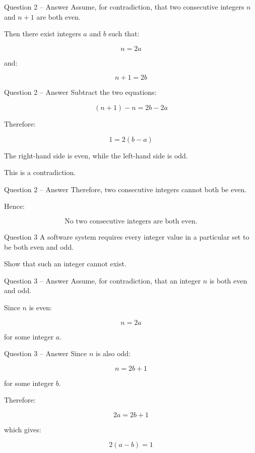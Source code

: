 \begin{frame}{Question 2 -- Answer}
Assume, for contradiction, that two consecutive integers $n$ and $n+1$
are both even.

Then there exist integers $a$ and $b$ such that:

$$
n=2a
$$

and:

$$
n+1=2b
$$

\end{frame}

\begin{frame}{Question 2 -- Answer}
Subtract the two equations:

$$
(n+1)-n=2b-2a
$$

Therefore:

$$
1=2(b-a)
$$

The right-hand side is even, while the left-hand side is odd.

This is a contradiction.
\end{frame}

\begin{frame}{Question 2 -- Answer}
Therefore, two consecutive integers cannot both be even.

Hence:

$$
\boxed{\text{No two consecutive integers are both even.}}
$$

\end{frame}


\begin{frame}{Question 3}
A software system requires every integer value in a particular set to be
both even and odd.

Show that such an integer cannot exist.
\end{frame}

\begin{frame}{Question 3 -- Answer}
Assume, for contradiction, that an integer $n$ is both even and odd.

Since $n$ is even:

$$
n=2a
$$

for some integer $a$.
\end{frame}

\begin{frame}{Question 3 -- Answer}
Since $n$ is also odd:

$$
n=2b+1
$$

for some integer $b$.

Therefore:

$$
2a=2b+1
$$

which gives:

$$
2(a-b)=1
$$

\end{frame}

